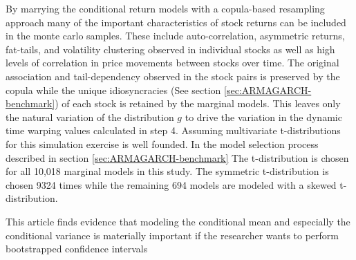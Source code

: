 \documentclass[12pt]{article}
\begin{document}
By marrying the conditional return models with a copula-based resampling approach many of the important characteristics of stock returns can be included in the monte carlo samples. These include auto-correlation, asymmetric returns, fat-tails, and volatility clustering observed in individual stocks as well as high levels of correlation in price movements between stocks over time. The original association and tail-dependency observed in the stock pairs is preserved by the copula while the unique idiosyncracies (See section \ref{sec:ARMAGARCH-benchmark}) of each stock is retained by the marginal models. This leaves only the natural variation of the distribution $g$ to drive the variation in the dynamic time warping values calculated in step 4. Assuming multivariate t-distributions for this simulation exercise is well founded. In the model selection process described in section \ref{sec:ARMAGARCH-benchmark} The t-distribution is chosen for all 10,018 marginal models in this study. The symmetric t-distribution is chosen 9324 times while the remaining 694 models are modeled with a skewed t-distribution.

This article finds evidence that modeling the conditional mean and especially the conditional variance is materially important if the researcher wants to perform bootstrapped confidence intervals
\end{document}
